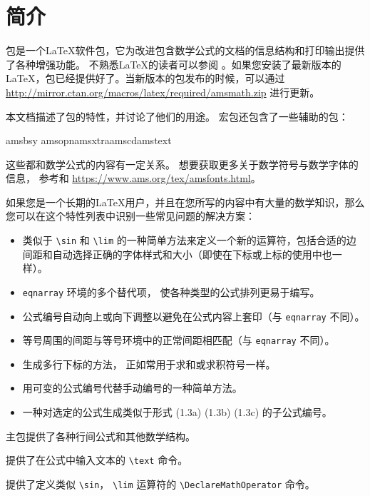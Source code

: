 

\chapter{简介}

包是一个\LaTeX 软件包，它为改进包含数学公式的文档的信息结构和打印输出提供了各种增强功能。 不熟悉\LaTeX 的读者可以参阅 \cite{3} 。如果您安装了最新版本的\LaTeX，包已经提供好了。当新版本的包发布的时候，可以通过 \url{http://mirror.ctan.org/macros/latex/required/amsmath.zip} 进行更新。

本文档描述了包的特性，并讨论了他们的用途。 宏包还包含了一些辅助的包：
\begin{center}
\ttfamily amsbsy \quad amsopn\quad amsxtra\quad amscd\quad amstext
\end{center}
这些都和数学公式的内容有一定关系。 想要获取更多关于数学符号与数学字体的信息，  参考\cite{8}和 \url{https://www.ams.org/tex/amsfonts.html}。

如果您是一个长期的\LaTeX 用户，并且在您所写的内容中有大量的数学知识，那么您可以在这个特性列表中识别一些常见问题的解决方案：

\begin{itemize}
\item 类似于 \verb|\sin| 和 \verb|\lim| 的一种简单方法来定义一个新的运算符，包括合适的边间距和自动选择正确的字体样式和大小（即使在下标或上标的使用中也一样）。
\item \texttt{eqnarray} 环境的多个替代项，  使各种类型的公式排列更易于编写。
\item 公式编号自动向上或向下调整以避免在公式内容上套印（与 \texttt{eqnarray} 不同）。
\item 等号周围的间距与等号环境中的正常间距相匹配（与 \texttt{eqnarray} 不同）。
\item 生成多行下标的方法，  正如常用于求和或求积符号一样。
\item 用可变的公式编号代替手动编号的一种简单方法。
\item 一种对选定的公式生成类似于形式 (1.3a) (1.3b) (1.3c) 的子公式编号。
\end{itemize}

主包提供了各种行间公式和其他数学结构。

提供了在公式中输入文本的 \verb|\text| 命令。

提供了定义类似 \verb|\sin|， \verb|\lim| 运算符的 \verb|\DeclareMathOperator| 命令。

